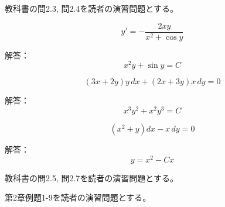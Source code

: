 \documentclass[report]{jlreq}
\begin{document}
\begin{problem}
    教科書の問2.3, 問2.4を読者の演習問題とする。
\end{problem}

\begin{problem}[2.4.2 完全形]
    \begin{equation}
        y' = - \frac{2xy}{x^2 + \cos y}
    \end{equation}

    解答：
    \begin{equation}
        x^2 y + \sin y = C
    \end{equation}
\end{problem}

\begin{problem}[2.4.3 積分因子タイプ1]
    \begin{equation}
        (3x + 2y) y\, dx + (2x + 3y) x\, dy = 0
    \end{equation}

    解答：
    \begin{equation}
        x^3 y^2 + x^2 y^3 = C
    \end{equation}
\end{problem}

\begin{problem}[2.4.4 積分因子タイプ2]
    \begin{equation}
        (x^2 + y) dx - x\, dy = 0
    \end{equation}

    解答：
    \begin{equation}
        y = x^2 - Cx
    \end{equation}
\end{problem}

\begin{problem}
    教科書の問2.5, 問2.7を読者の演習問題とする。
\end{problem}

\begin{problem}
    \cite{寺坂10} 第2章例題1-9を読者の演習問題とする。
\end{problem}
\end{document}
